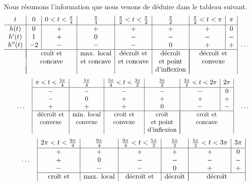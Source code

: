 {Nous résumons l'information que nous venons de déduire dans le tableau suivant.
\[
\begin{array}{c|c|c|c|c|c|c|c|}
\rule[-0.5em]{0em}{1em}
t & 0 & 0<t<\frac{\pi}{4} & \frac{\pi}{4} &
\frac{\pi}{2}<t<\frac{\pi}{2} & \frac{\pi}{2} &
\frac{\pi}{2}<t<\pi & \pi \\
\hline
h(t) & 0 & + & + & + & + & + & 0 \\
h'(t) & 1 & + & 0 & - & - & - & - \\
h''(t) & -2 & - & - & - & 0 & + & + \\
\hline
& \multicolumn{2}{|c|}{\text{croît et}} & \text{max. local} &
\text{décroît et} & \text{décroît} &
\multicolumn{2}{|c|}{\text{décroît et}} \\
& \multicolumn{2}{c|}{\text{concave}} & \text{et concave} &
\text{et concave} & \text{et point} & \multicolumn{2}{|c|}{\text{convexe}} \\
& \multicolumn{2}{|c|}{} & & & \text{d'inflexion} &
\multicolumn{2}{|c|}{}
\end{array} \ \ldots
\]
\[
\qquad \ldots \quad 
\begin{array}{|c|c|c|c|c|c|}
\rule[-0.5em]{0em}{1em}
\pi<t<\frac{5\pi}{4} & \frac{5\pi}{4} &
\frac{5\pi}{4}<t<\frac{3\pi}{2} & \frac{3\pi}{2} &
\frac{3\pi}{2}<t<2\pi & 2\pi \\
\hline
- & - & - & - & - & 0 \\
- & 0 & + & + & + & + \\
+ & + & + & 0 & - & - \\
\hline
\text{décroît et} & \text{min. local} & \text{croît et} & \text{croît} &
\multicolumn{2}{|c|}{\text{croît et}} \\
\text{convexe} & \text{convexe} & \text{convexe} & \text{et point} &
\multicolumn{2}{|c|}{\text{concave}}  \\
& & & \text{d'inflexion} & \multicolumn{2}{|c|}{}
\end{array} \quad \ldots
\]
\[
\qquad \ldots \quad
\begin{array}{|c|c|c|c|c|c|}
\rule[-0.5em]{0em}{1em}
2\pi<t<\frac{9\pi}{4} & \frac{9\pi}{4} & \frac{9\pi}{4}<t<\frac{5\pi}{2} &
\frac{5\pi}{2} & \frac{5\pi}{2}<t<3\pi & 3\pi \\
\hline
+ & + & + & + & + & 0 \\
+ & 0 & - & - & - & - \\
- & - & - & 0 & + & + \\
\hline
\text{croît et} & \text{max. local} & \text{décroît et} & \text{décroît} &
\multicolumn{2}{|c|}{\text{décroît}} \\

\end{array}\]}
